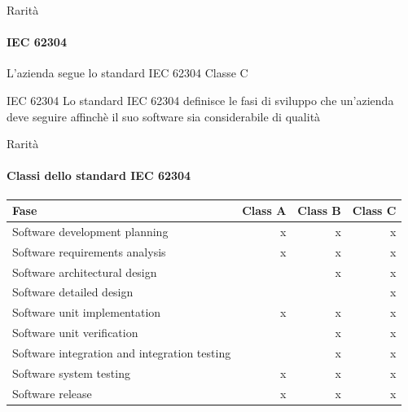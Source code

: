 \documentclass{beamer}
\begin{document}
\begin{darkframes}
  \begin{frame}{Rarità}
    \framesubtitle{IEC 62304}

    L'azienda segue lo standard IEC 62304 Classe C

    \begin{block}{IEC 62304}
      Lo standard IEC 62304 definisce le fasi di sviluppo che un'azienda deve seguire affinchè il suo software sia considerabile di qualità
    \end{block}

  \end{frame}

  \begin{frame}{Rarità}
    \framesubtitle{Classi dello standard IEC 62304}

    \begin{table}[!b]
      {\carlitoTLF %
        \begin{tabularx}{\textwidth}{Xrrr}
          \textbf{Fase}                                & \textbf{Class A} & \textbf{Class B} & \textbf{Class C} \\
          \toprule
          Software development planning                & x                & x                & x                \\
          Software requirements analysis               & x                & x                & x                \\
          Software architectural design                &                  & x                & x                \\
          Software detailed design                     &                  &                  & x                \\
          Software unit implementation                 & x                & x                & x                \\
          Software unit verification                   &                  & x                & x                \\
          Software integration and integration testing &                  & x                & x                \\
          Software system testing                      & x                & x                & x                \\
          Software release                             & x                & x                & x                \\
          \bottomrule
        \end{tabularx}}
    \end{table}


\end{frame}
\end{darkframes}
\end{document}
